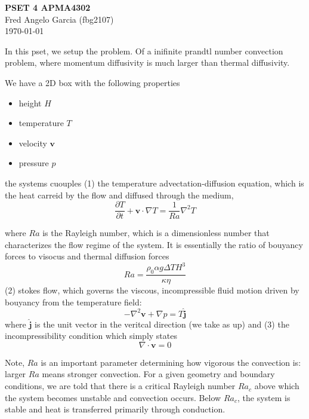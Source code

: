 \documentclass[12pt]{article}
\begin{document}
\begin{flushleft}
\textbf{PSET 4 APMA4302} \\
Fred Angelo Garcia (fbg2107) \\
\today
\end{flushleft}

\vspace{0.1in}

In this pset, we setup the problem. Of a inifinite prandtl number convection problem, where momentum diffusivity is much larger than thermal diffusivity. 

We have a 2D box with the following properties
\begin{itemize}
    \item height $H$
    \item temperature $T$
    \item velocity $\mathbf{v}$
    \item pressure $p$
\end{itemize}

the systems cuouples (1) the temperature advectation-diffusion equation, which is the heat carreid by the flow and diffused through the medium, 
\begin{equation} 
    \dfrac{\partial T}{\partial t} + \mathbf{v} \cdot \nabla T = \dfrac{1}{Ra}\nabla^2 T
\end{equation}

where $Ra$ is the Rayleigh number, which is a dimensionless number that characterizes the flow regime of the system. It is essentially the ratio of bouyancy forces to visocus and thermal diffusion forces
\begin{equation}
    Ra = \dfrac{\rho_0 \alpha g \Delta T H^3}{\kappa \eta}
\end{equation}
(2) stokes flow, which governs the viscous, incompressible fluid motion driven by bouyancy from the temperature field: 
\begin{equation}
    - \nabla^2 \mathbf{v} + \nabla p = T \mathbf {\hat{j} } 
    \label{eq:stokes}
\end{equation}
where $\mathbf {\hat{j} } $ is the unit vector in the veritcal direction (we take as up) and (3) the incompressibility condition which simply states
\begin{equation}
    \nabla \cdot \mathbf{v} = 0
    \label{eq:incompressibility}
\end{equation}

Note, $Ra$ is an important parameter determining how vigorous the convection is: larger $Ra$ means stronger convection. For a given geometry and boundary conditions, we are told that there is a critical Rayleigh number $Ra_c$ above which the system becomes unstable and convection occurs. Below $Ra_c$, the system is stable and heat is transferred primarily through conduction.
\end{document}
